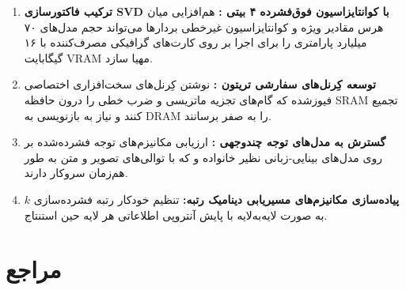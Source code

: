 \documentclass[12pt,a4paper]{report}
\theoremstyle{definition}
\begin{document}
\begin{enumerate}
    \item \textbf{ترکیب فاکتورسازی SVD با کوانتایزاسیون فوق‌فشرده ۴ بیتی :} هم‌افزایی میان هرس مقادیر ویژه و کوانتایزاسیون غیرخطی بردارها می‌تواند حجم مدل‌های ۷۰ میلیارد پارامتری را برای اجرا بر روی کارت‌های گرافیکی مصرف‌کننده با ۱۶ گیگابایت VRAM مهیا سازد.
    \item \textbf{توسعه کِرنل‌های سفارشی تریتون :} نوشتن کِرنل‌های سخت‌افزاری اختصاصی فیوزشده  که گام‌های تجزیه ماتریسی و ضرب خطی را درون حافظه SRAM تجمیع کنند و نیاز به بازنویسی به DRAM را به صفر برسانند.
    \item \textbf{گسترش به مدل‌های توجه چندوجهی :} ارزیابی مکانیزم‌های توجه فشرده‌شده بر روی مدل‌های بینایی-زبانی  نظیر خانواده  و  که با توالی‌های تصویر و متن به طور هم‌زمان سروکار دارند.
    \item \textbf{پیاده‌سازی مکانیزم‌های مسیریابی دینامیک رتبه:} تنظیم خودکار رتبه فشرده‌سازی $k$ به صورت لایه‌به‌لایه با پایش آنتروپی اطلاعاتی هر لایه حین استنتاج.
\end{enumerate}

\appendix


\chapter*{مراجع}
\end{document}
